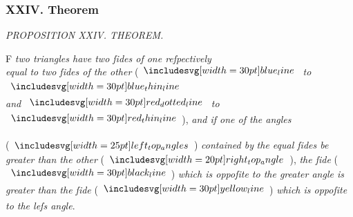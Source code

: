 \documentclass[12pt,preview]{standalone}
\begin{document}
\subsubsection{XXIV. Theorem}

\begin{minipage}[t]{0.33\textwidth}
    \vspace{40pt}
    
\end{minipage}%
\hfill
\begin{minipage}[t]{0.64\textwidth}
    \vspace{0pt}

    \begin{center}
        \textit{PROPOSITION XXIV. THEOREM.}\label{book1pr24} \\
    \end{center}

    \hfill

    \begin{center}
        \raggedright \lettrine[lines=4, loversize=1, nindent=0pt]{}{}F \textit{two triangles have two ſides of one reſpectively\\ equal to two ſides of the other} (\hspace{-1ex}$\blueline$ \textit{to} $\bluethinline$\\ \textit{and} $\dottedredline$ \textit{to} $\redthinline$\hspace{-1ex}), \textit{and if one of the angles}\\
    \end{center}
    \vspace{1ex}
    (\hspace{-1ex}$\img{left_top_angles}$\hspace{-1ex}) \textit{contained by} \textit{the equal ſides be greater than the other } (\hspace{-1ex}$\img[0][0][20]{right_top_angle}$\hspace{-1ex}), \textit{the ſide} (\hspace{-1ex}$\blackline$\hspace{-1ex}) \textit{which is oppoſite to the greater angle is greater than the ſide} (\hspace{-1ex}$\yellowline$\hspace{-1ex}) \textit{which is oppoſite to the leſs angle}.

    \hfill

    \hfill


\end{minipage}
\end{document}
